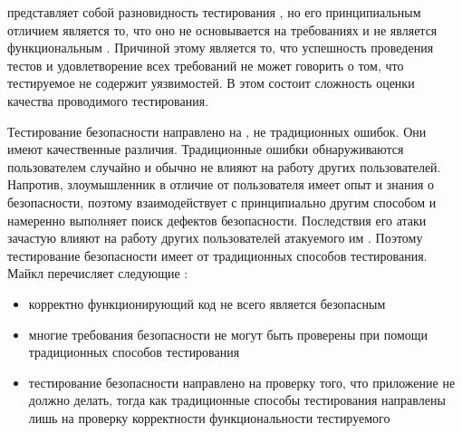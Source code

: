 %
 представляет собой разновидность тестирования , но его принципиальным отличием является то, что оно не основывается на требованиях и не является функциональным . 
%
Причиной этому является то, что успешность проведения тестов и удовлетворение всех требований не может говорить о том, что тестируемое  не содержит уязвимостей. 
%
В этом состоит сложность оценки качества проводимого тестирования. 

%
Тестирование безопасности  направлено на , не традиционных ошибок.
% 
Они имеют качественные различия. 
%
Традиционные ошибки обнаруживаются пользователем случайно и обычно не влияют на работу других пользователей.
%
Напротив, злоумышленник в отличие от пользователя имеет опыт и знания о безопасности, поэтому взаимодействует с  принципиально другим способом и намеренно выполняет поиск дефектов безопасности. 
%
Последствия его атаки зачастую влияют на работу других пользователей атакуемого им .
%
Поэтому тестирование безопасности  имеет  от традиционных способов тестирования. Майкл перечисляет следующие :
\begin{itemize}
	\setlength{\itemsep}{0pt}%

	\item корректно функционирующий код не всего является безопасным
	
	\item многие требования безопасности не могут быть проверены при помощи традиционных способов тестирования 

	\item тестирование безопасности  направлено на проверку того, что приложение не должно делать, тогда как традиционные способы тестирования  направлены лишь на проверку корректности функциональности тестируемого 
\end{itemize}

